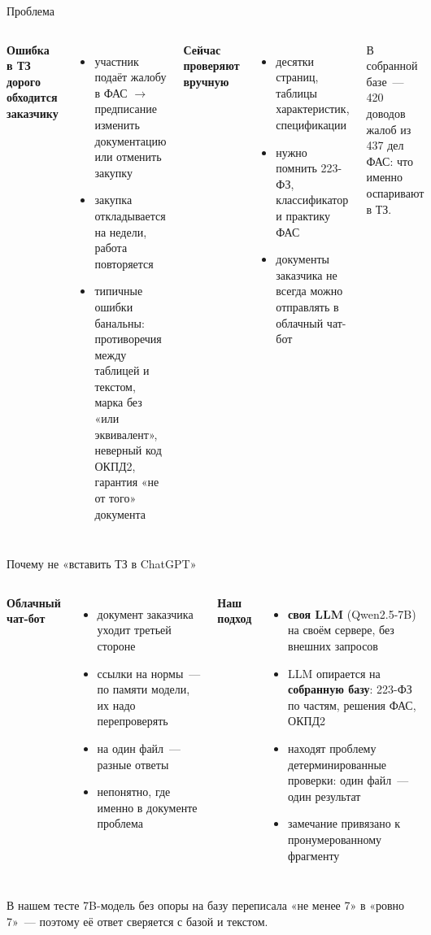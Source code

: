 \documentclass[aspectratio=169,11pt]{beamer}
\newcommand{\muted}[1]{{\color{miptgrey}#1}}
\begin{document}
\begin{frame}{Проблема}
  \begin{columns}[T]
    \textbf{Ошибка в ТЗ дорого обходится заказчику}
    \begin{itemize}
      \item участник подаёт жалобу в ФАС $\to$ предписание изменить документацию или отменить закупку
      \item закупка откладывается на недели, работа повторяется
      \item типичные ошибки банальны: противоречия между таблицей и текстом, марка без «или эквивалент», неверный код ОКПД2, гарантия «не от того» документа
    \end{itemize}
    \textbf{Сейчас проверяют вручную}
    \begin{itemize}
      \item десятки страниц, таблицы характеристик, спецификации
      \item нужно помнить 223-ФЗ, классификатор и практику ФАС
      \item документы заказчика не всегда можно отправлять в облачный чат-бот
    \end{itemize}
    \vspace{6pt}
    \muted{\small В собранной базе~— 420 доводов жалоб из 437 дел ФАС: что именно оспаривают в ТЗ.}
  \end{columns}
\end{frame}

\begin{frame}{Почему не «вставить ТЗ в ChatGPT»}
  \begin{columns}[T]
    \textbf{\color{mipterr}Облачный чат-бот}
    \begin{itemize}
      \item документ заказчика уходит третьей стороне
      \item ссылки на нормы~— по памяти модели, их надо перепроверять
      \item на один файл~— разные ответы
      \item непонятно, где именно в документе проблема
    \end{itemize}
    \textbf{\color{miptok}Наш подход}
    \begin{itemize}
      \item \textbf{своя LLM} (Qwen2.5-7B) на своём сервере, без внешних запросов
      \item LLM опирается на \textbf{собранную базу}: 223-ФЗ по частям, решения ФАС, ОКПД2
      \item находят проблему детерминированные проверки: один файл~— один результат
      \item замечание привязано к пронумерованному фрагменту
    \end{itemize}
  \end{columns}
  \vspace{10pt}
  \muted{\small В нашем тесте 7B-модель без опоры на базу переписала «не менее 7» в «ровно 7»~— поэтому её ответ сверяется с базой и текстом.}
\end{frame}
\end{document}

